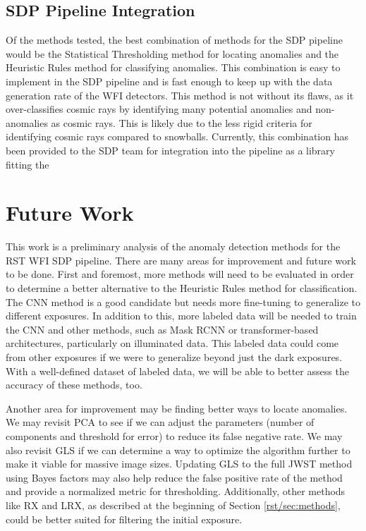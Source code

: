 \subsection{SDP Pipeline Integration}
Of the methods tested, the best combination of methods for the SDP pipeline would be the Statistical Thresholding method for locating anomalies and the Heuristic Rules method for classifying anomalies.
This combination is easy to implement in the SDP pipeline and is fast enough to keep up with the data generation rate of the WFI detectors.
This method is not without its flaws, as it over-classifies cosmic rays by identifying many potential anomalies and non-anomalies as cosmic rays.
This is likely due to the less rigid criteria for identifying cosmic rays compared to snowballs.
Currently, this combination has been provided to the SDP team for integration into the pipeline as a library fitting the 

\section{Future Work}
\label{rst/sec:future}
This work is a preliminary analysis of the anomaly detection methods for the RST WFI SDP pipeline.
There are many areas for improvement and future work to be done.
First and foremost, more methods will need to be evaluated in order to determine a better alternative to the Heuristic Rules method for classification. 
The CNN method is a good candidate but needs more fine-tuning to generalize to different exposures.
In addition to this, more labeled data will be needed to train the CNN and other methods, such as Mask RCNN or transformer-based architectures, particularly on illuminated data.
This labeled data could come from other exposures if we were to generalize beyond just the dark exposures.
With a well-defined dataset of labeled data, we will be able to better assess the accuracy of these methods, too. 

Another area for improvement may be finding better ways to locate anomalies.
We may revisit PCA to see if we can adjust the parameters (number of components and threshold for error) to reduce its false negative rate.
We may also revisit GLS if we can determine a way to optimize the algorithm further to make it viable for massive image sizes. 
Updating GLS to the full JWST method using Bayes factors may also help reduce the false positive rate of the method and provide a normalized metric for thresholding.
Additionally, other methods like RX and LRX, as described at the beginning of Section \ref{rst/sec:methods}, could be better suited for filtering the initial exposure.

